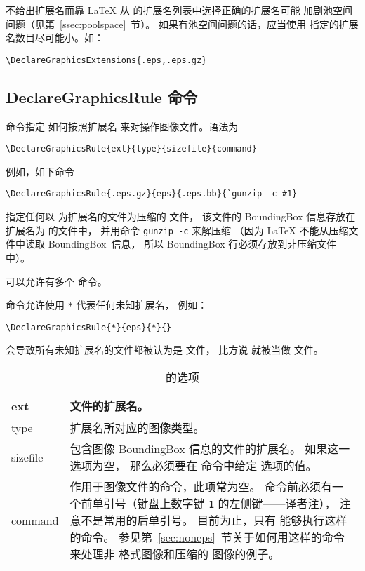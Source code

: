 不给出扩展名而靠 \LaTeX{} 从  的扩展名列表中选择正确的扩展名可能
加剧池空间问题（见第~\ref{ssec:poolspace}~节）。
如果有池空间问题的话，应当使用  指定的扩展名数目尽可能小。如：
\begin{lstlisting}
\DeclareGraphicsExtensions{.eps,.eps.gz}
\end{lstlisting}


\subsection{DeclareGraphicsRule 命令}\label{ssec:derule}
 命令指定  如何按照扩展名
来对操作图像文件。语法为
\begin{lstlisting}
\DeclareGraphicsRule{ext}{type}{sizefile}{command}
\end{lstlisting}
例如，如下命令
\begin{lstlisting}
\DeclareGraphicsRule{.eps.gz}{eps}{.eps.bb}{`gunzip -c #1}
\end{lstlisting}
指定任何以  为扩展名的文件为压缩的 文件，
该文件的 BoundingBox 信息存放在扩展名为  的文件中，
并用命令 \texttt{gunzip -c} 来解压缩
（因为 \LaTeX{} 不能从压缩文件中读取 BoundingBox~信息，
所以 BoundingBox 行必须存放到非压缩文件中）。

可以允许有多个  命令。

 命令允许使用 \texttt{*} 代表任何未知扩展名，
例如：
\begin{lstlisting}
\DeclareGraphicsRule{*}{eps}{*}{}
\end{lstlisting}
会导致所有未知扩展名的文件都被认为是  文件，
比方说  就被当做 文件。

\begin{table}
	\centering
	\caption{ 的选项}\label{tab:DeclaregruleArgs}
	\kaishu 
	\begin{tabular}{>{\ttfamily}l  P{0.7\textwidth}}
		\toprule
		ext & 文件的扩展名。 \\ \hline
		type & 扩展名所对应的图像类型。 \\ \hline
		sizefile & 包含图像 BoundingBox 信息的文件的扩展名。
		如果这一选项为空，
		那么必须要在  命令中给定  选项的值。 \\ \hline
		command & 作用于图像文件的命令，此项常为空。
		命令前必须有一个前单引号（键盘上数字键 \texttt{1} 的左侧键——译者注），
		注意不是常用的后单引号。
		目前为止，只有  能够执行这样的命令。
		参见第~\ref{sec:noneps}~节关于如何用这样的命令来处理非  格式图像和压缩的  图像的例子。\\
		\bottomrule
	\end{tabular}
\end{table}

